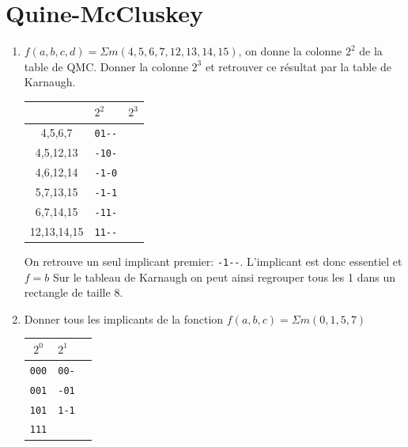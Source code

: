 \documentclass[a4paper,10pt]{exam}
\begin{document}
\section{Quine-McCluskey}
\begin{enumerate}
  \item $f(a,b,c,d) = \Sigma m(4,5,6,7,12,13,14,15)$, on donne la colonne $2^2$
    de la table de QMC. Donner la colonne $2^3$ et retrouver ce résultat par la
    table de Karnaugh.

    \begin{center}
    \begin{tabular}{cll}
              & $2^2$ & $2^3$ \\
      \hline
      4,5,6,7     & \verb!01--!  &\\
      4,5,12,13   & \verb!-10-!  &\\
      4,6,12,14   & \verb!-1-0!  &\\
      \hline
      5,7,13,15   & \verb!-1-1!  &\\
      6,7,14,15   & \verb!-11-!  &\\
      12,13,14,15 & \verb!11--!  &\\
      \hline
    \end{tabular}
    \end{center}

    \begin{solution}
      On retrouve un seul implicant premier: \verb!-1--!.
      L'implicant est donc essentiel et $f=b$
      Sur le tableau de Karnaugh on peut ainsi regrouper tous les 1
      dans un rectangle de taille 8.
    \end{solution}

    \item Donner tous les implicants de la fonction $f(a,b,c) = \Sigma
      m(0,1,5,7)$

      \begin{solution}
        \begin{center}
          \begin{tabular}{cll}
            $2^0$& $2^1$& \\
            \hline
            \verb!000!& \verb!00-!  &\\
            \hline
            \verb!001!& \verb!-01!  &\\
            \hline
            \verb!101!& \verb!1-1!  &\\
            \hline
            \verb!111!&  &\\
            \hline
          \end{tabular}
        \end{center}


\end{solution}
\end{enumerate}
\end{document}
